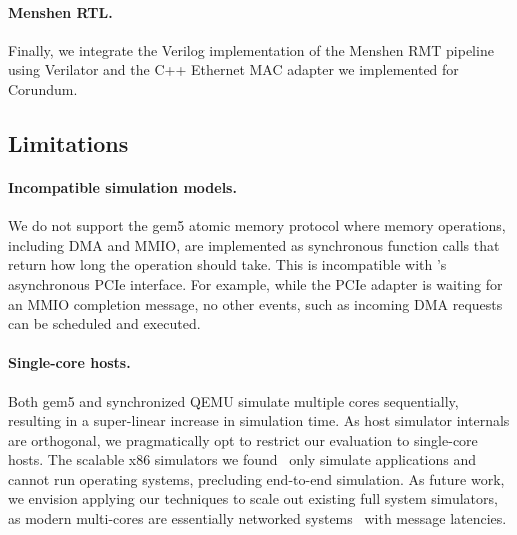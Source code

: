 \paragraph{Menshen RTL.}
Finally, we integrate the Verilog implementation of the Menshen RMT
pipeline~\cite{wang:menshen} using Verilator and the C++ Ethernet MAC
adapter we implemented for Corundum.

\subsection{Limitations}
\paragraph{Incompatible simulation models.}
We do not support the gem5 atomic memory protocol where memory
operations, including DMA and MMIO, are implemented as synchronous
function calls that return how long the operation should take.
%
This is incompatible with \sysname's asynchronous PCIe interface.
%
For example, while the \sysname PCIe adapter is waiting for an MMIO
completion message, no other events, such as incoming DMA requests can
be scheduled and executed.

\paragraph{Single-core hosts.}
Both gem5 and synchronized QEMU simulate multiple cores sequentially, resulting
in a super-linear increase in simulation time.
%
As host simulator internals are orthogonal, we pragmatically opt to
restrict our evaluation to single-core hosts.
%
The scalable x86 simulators we
found~\cite{miller:graphite,fu:prime,sanchez:zsim} only simulate
applications and cannot run operating systems, precluding end-to-end
simulation.
%
As future work, we envision applying our techniques to scale out existing full
system simulators, as modern multi-cores are essentially networked
systems~\cite{baumann:osdistsys} with message latencies.

